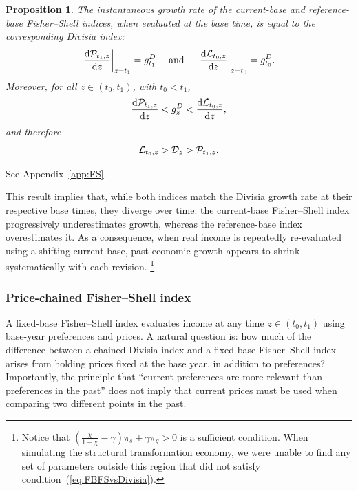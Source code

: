 \documentclass[12pt,a4paper]{article}
\newtheorem{proposition}{Proposition}
\newcommand{\red}[1]{\textcolor{red}{#1}} %
\begin{document}
\begin{proposition}\label{prop:FS}
The instantaneous growth rate of the current-base and reference-base Fisher--Shell indices, when evaluated at the base time, is equal to the corresponding Divisia index:
\begin{equation}\label{eq:FBFS}
\left. \frac{\mathrm{d}  {\cal P}_{t_1,z}}{\mathrm{d} z} \right|_{z=t_1} =  g^{D}_{t_1} 
\ \ \ \ \text{and}\ \ \ \ 
\left. \frac{\mathrm{d}  {\cal L}_{t_0,z}}{\mathrm{d} z} \right|_{z=t_0} = g^{D}_{t_0} .
\end{equation}
Moreover, for all \( z \in (t_0, t_1) \), with \( t_0 < t_1 \),
\begin{equation}\label{eq:FBFSvsDivisia}
\frac{\mathrm{d}  {\cal P}_{t_1,z}}{\mathrm{d} z}  <  g^{D}_{z} < 
\frac{\mathrm{d}  {\cal L}_{t_0,z}}{\mathrm{d} z},
\end{equation}
and therefore
$${\cal L}_{t_0,z} > {\cal D}_{z}  > {\cal P}_{t_1,z}.$$
\end{proposition}

 See Appendix~\ref{app:FS}.

This result implies that, while both indices match the Divisia growth rate at their respective base times, they diverge over time: the current-base Fisher–Shell index progressively underestimates growth, whereas the reference-base index overestimates it.  
As a consequence, when real income is repeatedly re-evaluated using a shifting current base, past economic growth appears to shrink systematically with each revision.%
\footnote{Notice that \( \left(\frac{\chi}{1-\chi} - \gamma\right)\pi_s + \gamma \pi_g > 0 \) is a sufficient condition.  
When simulating the structural transformation economy, we were unable to find any set of parameters outside this region that did not satisfy condition~(\ref{eq:FBFSvsDivisia}).}


\subsubsection{Price-chained Fisher–Shell index}

A fixed-base Fisher--Shell index evaluates income at any time \( z \in (t_0, t_1) \) using base-year preferences and prices.  
A natural question is: how much of the difference between a chained Divisia index and a fixed-base Fisher--Shell index arises from holding prices fixed at the base year, in addition to preferences?  
Importantly, the principle that “current preferences are more relevant than preferences in the past” does not imply that current prices must be used when comparing two different points in the past.
\end{document}
